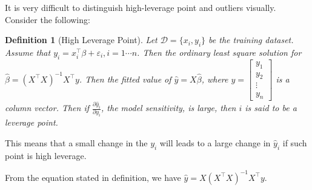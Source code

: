 \documentclass{article}
\theoremstyle{MyNonumberplain}
\theoremstyle{break}
\newcommand{\ve}{\varepsilon}
\newcommand{\T}{^\intercal}
\newcommand{\inv}{^{-1}}
\newcommand{\pd}[2]{\frac{\partial {#1}}{\partial {#2}}}
\theoremstyle{break}
\newtheorem{definition}{Definition}[section]
\begin{document}
It is very difficult to distinguish high-leverage point and outliers visually. Consider the following:

\begin{defbox}
    \begin{definition}[High Leverage Point]
        Let $\mathcal{D}=\bigl\{x_i,y_i\bigr\}$ be the training dataset. Assume that $y_i=x_i\T\beta+\ve_i, i=1\cdots n$.
        Then the ordinary least square solution for $\hat\beta=(X\T X)\inv X\T y$. Then the fitted value of $\hat y=X\hat\beta$, where
        $y=\begin{bmatrix}
            y_1\\
            y_2\\
            \vdots\\
            y_n
            \end{bmatrix}	
        $ is a column vector. Then if $\pd{\hat y_i}{y_i}$, the model sensitivity, is large, then $i$ is said to be a leverage point.
        
    \end{definition}
\end{defbox}

This means that a small change in the $y_i$ will leads to a large change in $\hat y_i$ if such point is high leverage. 

From the equation stated in definition, we have $\hat y=X(X\T X)\inv X\T y$.
\end{document}
